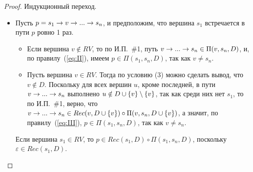 \begin{defn}
\begin{proof}
Индукционный переход.
\begin{itemize}
    \item Пусть $p = s_1 \rightarrow v \rightarrow ... \rightarrow s_n$, и предположим, что вершина $s_1$ встречается в пути $p$ ровно 1 раз.
    \begin{itemize}
        \item Если вершина $v \notin RV$, то по И.П.~\#1, путь $v \rightarrow ... \rightarrow s_n \in \Pi(v,s_n,D)$, и, по правилу~(\ref{eq:II}), имеем $p \in \Pi(s_1,s_n,D)$, 
        так как $v \neq s_n$.
        \item Пусть вершина $v \in RV$. Тогда по условию (3) можно сделать вывод, что $v \notin D$.
        Поскольку для всех вершин $u$, кроме последней, в пути $v \rightarrow ... \rightarrow s_n$ выполнено 
        $u \notin D \cup \{v\} \setminus \{v\}$, так как среди них нет $s_1$,
        то по И.П.~\#1, верно, что $v \rightarrow ... \rightarrow s_n \in Rec(v,D \cup \{v\}) \circ \Pi(v, s_n,D \cup \{v\})$, а значит, по правилу~(\ref{eq:III}), 
        $p \in \Pi(s_1, s_n, D)$, так как $v \neq s_n$.
    \end{itemize}
    Если вершина $s_1 \in RV$, то $p \in Rec(s_1,D) \circ \Pi(s_1,s_n,D)$, поскольку $\varepsilon \in Rec(s_1,D)$.
    

\end{itemize}
\end{proof}
\end{defn}
